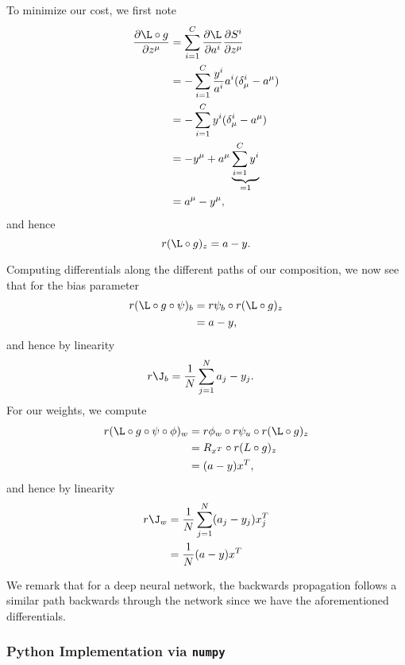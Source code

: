 To minimize our cost, we first note
\begin{align*}
	\frac{\partial\L\circ g}{\partial z^\mu}&=\sum_{i=1}^C\frac{\partial\L}{\partial a^i}\frac{\partial S^i}{\partial z^\mu}\\
	&=-\sum_{i=1}^C\frac{y^i}{a^i}a^i(\delta^i_\mu-a^\mu)\\
	&=-\sum_{i=1}^Cy^i(\delta^i_\mu-a^\mu)\\
	&=-y^\mu+a^\mu\underbrace{\sum_{i=1}^Cy^i}_{=1}\\
	&=a^\mu-y^\mu,
\end{align*}
and hence
$$r(\L\circ g)_z=a-y.$$

Computing differentials along the different paths of our composition, we now see that for the bias parameter
\begin{align*}
	r(\L\circ g\circ\psi)_b&=r\psi_b\circ r(\L\circ g)_z\\
	&=a-y,
\end{align*}
and hence by linearity
\begin{align*}
	r\J_b&=\frac{1}{N}\sum_{j=1}^Na_j-y_j.
\end{align*}
For our weights, we compute
\begin{align*}
	r(\L\circ g\circ\psi\circ\phi)_w&=r\phi_w\circ r\psi_u\circ r(\L\circ g)_z\\
	&=R_{x^T}\circ r(L\circ g)_z\\
	&=(a-y)x^T,
\end{align*}
and hence by linearity
\begin{align*}
	r\J_w &=\frac{1}{N}\sum_{j=1}^N(a_j-y_j)x_j^T\\
	&=\frac{1}{N}(a-y)x^T
\end{align*}

We remark that for a deep neural network, the backwards propagation follows a similar path backwards through the network since we have the aforementioned differentials.



\subsubsection{Python Implementation via \texttt{numpy}}





















